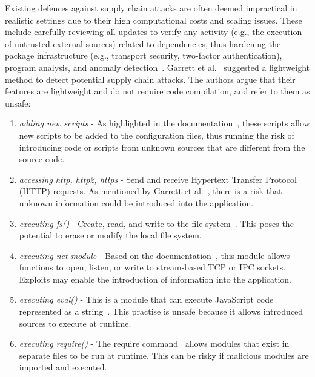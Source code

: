 \documentclass[sigconf,screen]{acmart}
\begin{document}
\begin{sloppy}
Existing defences against supply chain attacks are often deemed impractical in realistic settings due to their high computational costs and scaling issues.
These include carefully reviewing all updates to verify any activity (e.g., the execution of untrusted external sources) related to dependencies, thus hardening the package infrastructure (e.g., transport security, two-factor authentication), program analysis, and anomaly detection~\citep{Thecompl84:online, Nikitin:2017, Livshits:2009, GarrettICSE-NIER19}. 
Garrett et al.~\citep{GarrettICSE-NIER19} suggested a lightweight method to detect potential supply chain attacks.
The authors argue that their features are lightweight and do not require code compilation, and refer to them as unsafe:
\begin{enumerate}
    \item \textit{adding new scripts} - As highlighted in the documentation~\citep{Aboutnpm57:online}, these scripts allow new scripts to be added to the configuration files, thus running the risk of introducing code or scripts from unknown sources that are different from the source code.
    \item \textit{accessing http, http2, https} - Send and receive Hypertext Transfer Protocol (HTTP) requests. As mentioned by Garrett et al.~\citep{GarrettICSE-NIER19}, there is a risk that unknown information could be introduced into the application.
    \item \textit{executing fs()} - Create, read, and write to the file system~\citep{Filesyst74:online}. This poses the potential to erase or modify the local file system.
    \item \textit{executing net module} - Based on the documentation~\citep{NetNodej20:online}, this module allows functions to open, listen, or write to stream-based TCP or IPC sockets. Exploits may enable the introduction of information into the application.
    \item \textit{executing eval()} - This is a module that can execute JavaScript code represented as a string~\citep{evalJava75:online}. This practise is unsafe because it allows introduced sources to execute at runtime.
    \item \textit{executing require()} - The require command~\citep{JavaScri65:online} allows modules that exist in separate files to be run at runtime. This can be risky if malicious modules are imported and executed. 
\end{enumerate}


\end{sloppy}
\end{document}
